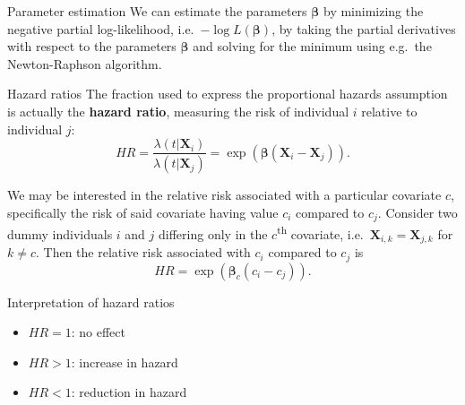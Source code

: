 \begin{frame}{Parameter estimation}
    We can estimate the parameters $\boldsymbol{\beta}$ by minimizing the negative partial log-likelihood, i.e.\ $-\log L(\boldsymbol\beta)$, by taking the partial derivatives with respect to the parameters $\boldsymbol{\beta}$ and solving for the minimum using e.g.\ the Newton-Raphson algorithm.
\end{frame}
\begin{frame}{Hazard ratios}
    The fraction used to express the proportional hazards assumption is actually the \textbf{hazard ratio}, measuring the risk of individual $i$ relative to individual $j$:
    \begin{equation*}
        HR =
            \frac{\lambda(t|\mathbf{X}_i)}{\lambda(t|\mathbf{X}_j)} = \exp\left(\boldsymbol{\beta}(\mathbf{X}_i - \mathbf{X}_j)\right).
    \end{equation*}

    \pause
    We may be interested in the relative risk associated with a particular covariate $c$, specifically the risk of said covariate having value $c_i$ compared to $c_j$.
    Consider two dummy individuals $i$ and $j$ differing only in the $c$\textsuperscript{th} covariate, i.e.\ $\mathbf{X}_{i,k} = \mathbf{X}_{j,k}$ for $k \neq c$.
    Then the relative risk associated with $c_i$ compared to $c_j$ is
    \begin{equation*}
        HR = \exp\left({\boldsymbol\beta}_c (c_i - c_j)\right).
    \end{equation*}
\end{frame}
\begin{frame}{Interpretation of hazard ratios}
    \begin{itemize}
        \item $HR=1$: no effect
        \item $HR>1$: increase in hazard
        \item $HR<1$: reduction in hazard
    \end{itemize}
\end{frame}




